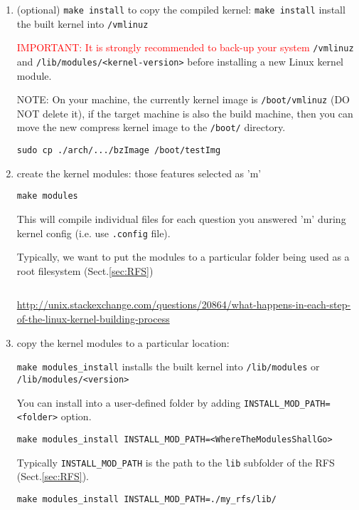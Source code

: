 \begin{enumerate}
  \item (optional) \verb!make install! to copy the compiled kernel:
  \verb!make install! install the built kernel into \verb!/vmlinuz! 
  
\textcolor{red}{IMPORTANT: It is strongly recommended to back-up your system}
\verb!/vmlinuz! and 
\verb!/lib/modules/<kernel-version>! before installing a new Linux kernel
module.

NOTE: On your machine, the currently kernel image is \verb!/boot/vmlinuz! (DO NOT delete it),
if the target machine is also the build machine, then you can move the new compress kernel image
to the \verb!/boot/! directory.
\begin{verbatim}
sudo cp ./arch/.../bzImage /boot/testImg
\end{verbatim}

  \item create the kernel modules: those features selected as 'm'
  
\begin{verbatim}
make modules
\end{verbatim}
This will compile individual files for each question you
answered 'm' during kernel config (i.e. use \verb!.config! file).
 
Typically, we want to put the modules to a particular folder being used as a
root filesystem (Sect.\ref{sec:RFS})
\begin{verbatim}
\end{verbatim}

\url{http://unix.stackexchange.com/questions/20864/what-happens-in-each-step-of-the-linux-kernel-building-process}

  \item copy the kernel modules to a particular location:
    
\verb!make modules_install! installs the built kernel into \verb!/lib/modules!
or \verb!/lib/modules/<version>!

You can install into a user-defined folder by adding
\verb!INSTALL_MOD_PATH=<folder>! option.

\begin{verbatim}
make modules_install INSTALL_MOD_PATH=<WhereTheModulesShallGo> 
\end{verbatim}
Typically \verb!INSTALL_MOD_PATH! is the path to the \verb!lib! subfolder
of the RFS (Sect.\ref{sec:RFS}).
\begin{verbatim}
make modules_install INSTALL_MOD_PATH=./my_rfs/lib/
\end{verbatim}

\end{enumerate}


